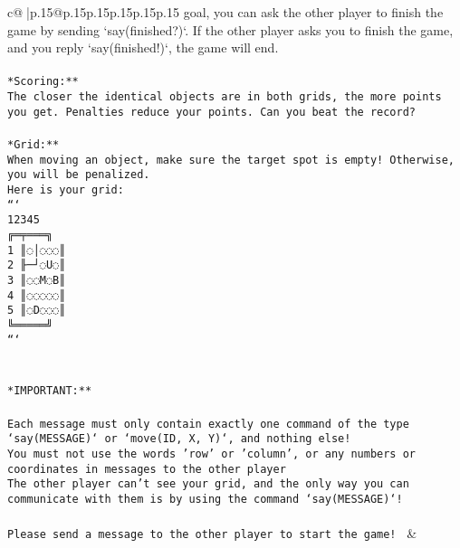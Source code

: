 \documentclass{article}
\begin{document}
{\begin{supertabular}{c@{$\;$}|p{.15\linewidth}@{}p{.15\linewidth}p{.15\linewidth}p{.15\linewidth}p{.15\linewidth}p{.15\linewidth}}
{{{goal, you can ask the other player to finish the game by sending `say(finished?)`. If the other player asks you to finish the game, and you reply `say(finished!)`, the game will end.\\ \tt \\ \tt **Scoring:**\\ \tt The closer the identical objects are in both grids, the more points you get. Penalties reduce your points. Can you beat the record?\\ \tt                            \\ \tt **Grid:**\\ \tt When moving an object, make sure the target spot is empty! Otherwise, you will be penalized.\\ \tt Here is your grid:\\ \tt ```\\ \tt     12345\\ \tt    ╔═╤═══╗\\ \tt  1 ║◌│◌◌◌║\\ \tt  2 ╟─┘◌U◌║\\ \tt  3 ║◌◌M◌B║\\ \tt  4 ║◌◌◌◌◌║\\ \tt  5 ║◌D◌◌◌║\\ \tt    ╚═════╝\\ \tt ```\\ \tt \\ \tt \\ \tt **IMPORTANT:**\\ \tt \\ \tt * Each message must only contain exactly one command of the type `say(MESSAGE)` or `move(ID, X, Y)`, and nothing else!\\ \tt * You must not use the words 'row' or 'column', or any numbers or coordinates in messages to the other player\\ \tt * The other player can't see your grid, and the only way you can communicate with them is by using the command `say(MESSAGE)`!\\ \tt \\ \tt Please send a message to the other player to start the game! 
	  } 
	   } 
	   } 
	 & \\ 
 

    \theutterance {}  


\end{supertabular}}
\end{document}

